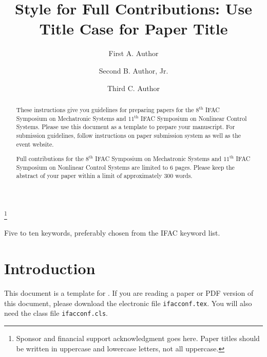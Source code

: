 \documentclass{ifacconf}
\begin{document}
\begin{frontmatter}

\title{Style for Full Contributions: Use Title Case for
  Paper Title} 

\thanks[footnoteinfo]{Sponsor and financial support acknowledgment
goes here. Paper titles should be written in uppercase and lowercase
letters, not all uppercase.}

\author[First]{First A. Author} 
\author[Second]{Second B. Author, Jr.} 
\author[Third]{Third C. Author}

\address[First]{National Institute of Standards and Technology, 
   Boulder, CO 80305 USA (e-mail: author@ boulder.nist.gov).}
\address[Second]{Colorado State University, 
   Fort Collins, CO 80523 USA (e-mail: author@lamar. colostate.edu)}
\address[Third]{Electrical Engineering Department, 
   Seoul National University, Seoul, Korea, (e-mail: author@snu.ac.kr)}

\begin{abstract}                %
These instructions give you guidelines for preparing papers for the $8^{\mathrm{th}}$ IFAC Symposium on Mechatronic Systems and $11^{\mathrm{th}}$ IFAC Symposium on Nonlinear Control Systems. Please use this document as a template to prepare your manuscript. For submission guidelines, follow instructions on paper submission system as well as the event website. 

Full contributions for the $8^{\mathrm{th}}$ IFAC Symposium on Mechatronic Systems and $11^{\mathrm{th}}$ IFAC Symposium on Nonlinear Control Systems are limited to 6 pages. Please keep the abstract of your paper within a limit of approximately 300 words.
\end{abstract}

\begin{keyword}
Five to ten keywords, preferably chosen from the IFAC keyword list.
\end{keyword}

\end{frontmatter}

\section{Introduction}
This document is a template for \LaTeXe. If you are reading a paper or
PDF version of this document, please download the electronic file
\texttt{ifacconf.tex}. You will also need the class file
\texttt{ifacconf.cls}.
\end{document}
